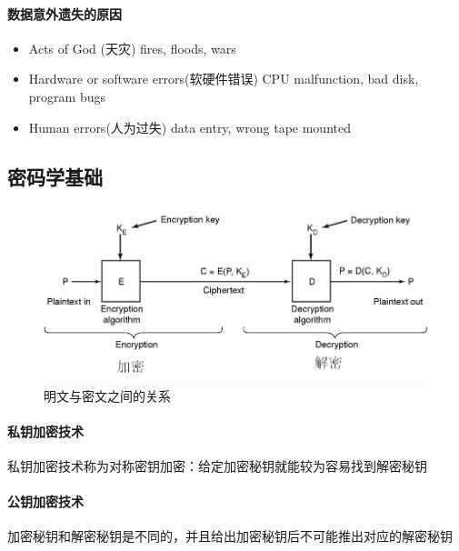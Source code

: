 \documentclass[UTF8,a4paper]{ctexart}
\begin{document}
\paragraph{数据意外遗失的原因}
\begin{itemize}
	\item Acts of God  (天灾)
fires, floods, wars
\item Hardware or software errors(软硬件错误)
CPU malfunction, bad disk, program bugs
\item Human errors(人为过失)
data entry, wrong tape mounted
\end{itemize}

\subsection{密码学基础}
\begin{figure}[H]
	\centering
	\includegraphics[scale = 0.5]{assets/ModernOperatingSystems/2018-01-10-20-05-14.png}
	\caption{明文与密文之间的关系}
\end{figure}

\paragraph{私钥加密技术}私钥加密技术称为对称密钥加密：给定加密秘钥就能较为容易找到解密秘钥

\paragraph{公钥加密技术} 加密秘钥和解密秘钥是不同的，并且给出加密秘钥后不可能推出对应的解密秘钥
\end{document}
